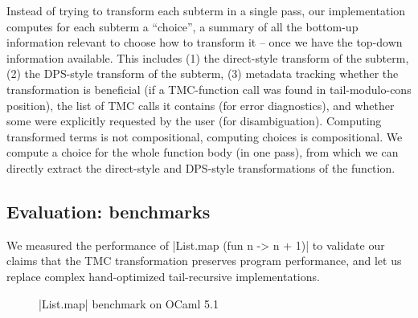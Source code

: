 Instead of trying to transform each subterm in a single pass, our implementation computes for each subterm a ``choice'', a summary of all the bottom-up information relevant to choose how to transform it -- once we have the top-down information available. This includes (1) the direct-style transform of the subterm, (2) the DPS-style transform of the subterm, (3) metadata tracking whether the transformation is beneficial (if a TMC-function call was found in tail-modulo-cons position), the list of TMC calls it contains (for error diagnostics), and whether some were explicitly requested by the user (for disambiguation). Computing transformed terms is not compositional, computing choices is compositional. We compute a choice for the whole function body (in one pass), from which we can directly extract the direct-style and DPS-style transformations of the function.

\subsection{Evaluation: benchmarks}

We measured the performance of \ocaml|List.map (fun n -> n + 1)| to validate our claims that the TMC transformation preserves program performance, and let us replace complex hand-optimized tail-recursive implementations.

\begin{figure}[tp]
\def\svgscale{0.8}
\graphicspath{{plots/}}

\caption{\ocaml|List.map| benchmark on OCaml 5.1}
\label{fig:bench5}
\end{figure}

\newcommand{\bench}[1]{\textbf{#1}}

